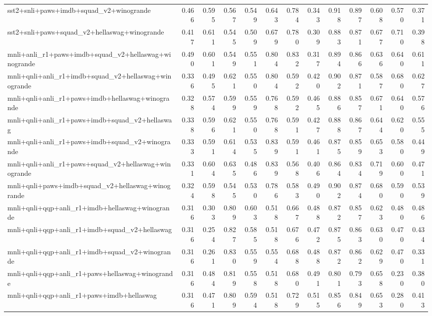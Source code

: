 \begin{table}[t]
\begin{tabular}{lrrrrrrrrrrrr}
    sst2+snli+paws+imdb+squad\_v2+winogrande & 0.466 & 0.595 & 0.567 & 0.549 & 0.643 & 0.784 & 0.343 & 0.918 & 0.897 & 0.608 & 0.570 & 0.371 \\
    sst2+snli+paws+squad\_v2+hellaswag+winogrande & 0.417 & 0.611 & 0.545 & 0.509 & 0.679 & 0.780 & 0.309 & 0.883 & 0.871 & 0.677 & 0.710 & 0.398 \\
    \addlinespace
    mnli+anli\_r1+paws+imdb+squad\_v2+hellaswag+winogrande & 0.490 & 0.601 & 0.549 & 0.551 & 0.804 & 0.832 & 0.317 & 0.894 & 0.866 & 0.636 & 0.640 & 0.611 \\
    mnli+qnli+anli\_r1+imdb+squad\_v2+hellaswag+winogrande & 0.336 & 0.495 & 0.621 & 0.550 & 0.804 & 0.592 & 0.420 & 0.902 & 0.871 & 0.587 & 0.680 & 0.627 \\
    mnli+qnli+anli\_r1+paws+imdb+hellaswag+winogrande & 0.328 & 0.574 & 0.599 & 0.559 & 0.768 & 0.592 & 0.465 & 0.886 & 0.857 & 0.671 & 0.640 & 0.576 \\
    mnli+qnli+anli\_r1+paws+imdb+squad\_v2+hellaswag & 0.338 & 0.596 & 0.621 & 0.550 & 0.768 & 0.591 & 0.427 & 0.888 & 0.867 & 0.644 & 0.620 & 0.555 \\
    mnli+qnli+anli\_r1+paws+imdb+squad\_v2+winogrande & 0.333 & 0.591 & 0.614 & 0.535 & 0.839 & 0.591 & 0.461 & 0.875 & 0.859 & 0.653 & 0.580 & 0.449 \\
    mnli+qnli+anli\_r1+paws+squad\_v2+hellaswag+winogrande & 0.331 & 0.604 & 0.635 & 0.486 & 0.839 & 0.568 & 0.406 & 0.864 & 0.834 & 0.719 & 0.600 & 0.471 \\
    mnli+qnli+paws+imdb+squad\_v2+hellaswag+winogrande & 0.324 & 0.598 & 0.545 & 0.530 & 0.786 & 0.583 & 0.490 & 0.902 & 0.874 & 0.680 & 0.590 & 0.539 \\
    mnli+qnli+qqp+anli\_r1+imdb+hellaswag+winogrande & 0.316 & 0.303 & 0.809 & 0.603 & 0.518 & 0.667 & 0.488 & 0.872 & 0.857 & 0.623 & 0.480 & 0.486 \\
    mnli+qnli+qqp+anli\_r1+imdb+squad\_v2+hellaswag & 0.316 & 0.254 & 0.827 & 0.585 & 0.518 & 0.676 & 0.472 & 0.875 & 0.863 & 0.630 & 0.470 & 0.434 \\
    mnli+qnli+qqp+anli\_r1+imdb+squad\_v2+winogrande & 0.316 & 0.261 & 0.830 & 0.559 & 0.554 & 0.688 & 0.488 & 0.872 & 0.862 & 0.629 & 0.470 & 0.331 \\
    mnli+qnli+qqp+anli\_r1+paws+hellaswag+winogrande & 0.316 & 0.484 & 0.819 & 0.558 & 0.518 & 0.680 & 0.491 & 0.801 & 0.793 & 0.658 & 0.230 & 0.380 \\
    mnli+qnli+qqp+anli\_r1+paws+imdb+hellaswag & 0.316 & 0.471 & 0.809 & 0.594 & 0.518 & 0.729 & 0.515 & 0.856 & 0.849 & 0.653 & 0.280 & 0.413 \\

\end{tabular}
\end{table}
